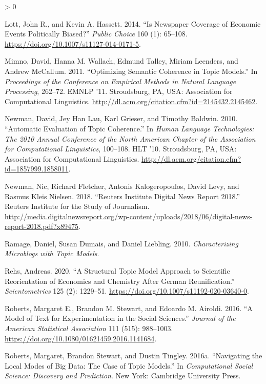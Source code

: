 \documentclass[
  12pt,
]{article}
\newlength{\cslhangindent}
\newenvironment{CSLReferences}[2] %
 {%
  \setlength{\parindent}{0pt}
  \ifodd #1 \everypar{\setlength{\hangindent}{\cslhangindent}}\ignorespaces\fi
  \ifnum #2 > 0
  \setlength{\parskip}{#2\baselineskip}
  \fi
 }%
 {}
\begin{document}
\begin{CSLReferences}{1}{0}
\leavevmode\hypertarget{ref-lott_is_2014}{}%
Lott, John R., and Kevin A. Hassett. 2014. {``Is Newspaper Coverage of
Economic Events Politically Biased?''} \emph{Public Choice} 160 (1):
65--108. \url{https://doi.org/10.1007/s11127-014-0171-5}.

\leavevmode\hypertarget{ref-mimno_optimizing_2011}{}%
Mimno, David, Hanna M. Wallach, Edmund Talley, Miriam Leenders, and
Andrew McCallum. 2011. {``Optimizing Semantic Coherence in Topic
Models.''} In \emph{Proceedings of the Conference on Empirical Methods
in Natural Language Processing}, 262--72. {EMNLP} '11. Stroudsburg,
{PA}, {USA}: Association for Computational Linguistics.
\url{http://dl.acm.org/citation.cfm?id=2145432.2145462}.

\leavevmode\hypertarget{ref-newman_automatic_2010}{}%
Newman, David, Jey Han Lau, Karl Grieser, and Timothy Baldwin. 2010.
{``Automatic Evaluation of Topic Coherence.''} In \emph{Human Language
Technologies: The 2010 Annual Conference of the North American Chapter
of the Association for Computational Linguistics}, 100--108. {HLT} '10.
Stroudsburg, {PA}, {USA}: Association for Computational Linguistics.
\url{http://dl.acm.org/citation.cfm?id=1857999.1858011}.

\leavevmode\hypertarget{ref-newman_reuters_2018}{}%
Newman, Nic, Richard Fletcher, Antonis Kalogeropoulos, David Levy, and
Rasmus Kleis Nielsen. 2018. {``Reuters Institute Digital News Report
2018.''} Reuters Institute for the Study of Journalism.
\url{http://media.digitalnewsreport.org/wp-content/uploads/2018/06/digital-news-report-2018.pdf?x89475}.

\leavevmode\hypertarget{ref-ramage_characterizing_2010}{}%
Ramage, Daniel, Susan Dumais, and Daniel Liebling. 2010.
\emph{Characterizing Microblogs with Topic Models}.

\leavevmode\hypertarget{ref-rehs_structural_2020}{}%
Rehs, Andreas. 2020. {``A Structural Topic Model Approach to Scientific
Reorientation of Economics and Chemistry After German Reunification.''}
\emph{Scientometrics} 125 (2): 1229--51.
\url{https://doi.org/10.1007/s11192-020-03640-0}.

\leavevmode\hypertarget{ref-roberts_model_2016}{}%
Roberts, Margaret E., Brandon M. Stewart, and Edoardo M. Airoldi. 2016.
{``A Model of Text for Experimentation in the Social Sciences.''}
\emph{Journal of the American Statistical Association} 111 (515):
988--1003. \url{https://doi.org/10.1080/01621459.2016.1141684}.

\leavevmode\hypertarget{ref-roberts_navigating_2016}{}%
Roberts, Margaret, Brandon Stewart, and Dustin Tingley. 2016a.
{``Navigating the Local Modes of Big Data: The Case of Topic Models.''}
In \emph{Computational Social Science: Discovery and Prediction}. New
York: Cambridge University Press.


\end{CSLReferences}
\end{document}
